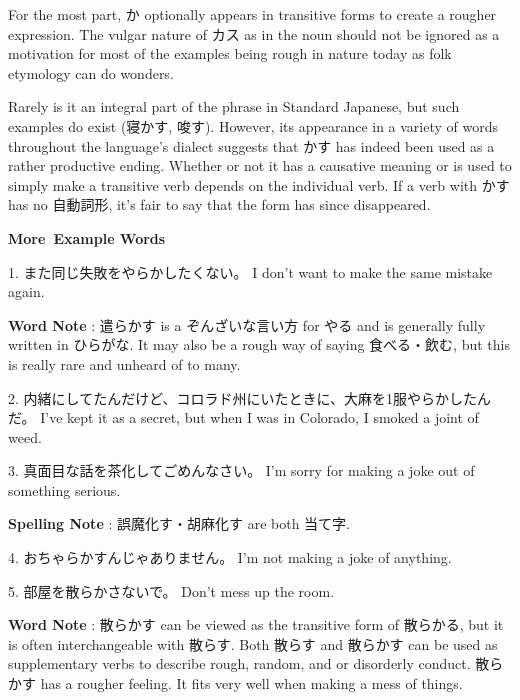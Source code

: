\par{ For the most part, か optionally appears in transitive forms to create a rougher expression. The vulgar nature of カス as in the noun should not be ignored as a motivation for most of the examples being rough in nature today as folk etymology can do wonders. }

\par{ Rarely is it an integral part of the phrase in Standard Japanese, but such examples do exist (寝かす, 唆す). However, its appearance in a variety of words throughout the language's dialect suggests that かす has indeed been used as a rather productive ending. Whether or not it has a causative meaning or is used to simply make a transitive verb depends on the individual verb. If a verb with かす has no 自動詞形, it's fair to say that the form has since disappeared. }

\begin{center}
 \textbf{More Example Words }
\end{center}

\par{1. また同じ失敗をやらかしたくない。 \hfill\break
I don't want to make the same mistake again. }

\par{\textbf{Word Note }: 遣らかす is a ぞんざいな言い方 for やる and is generally fully written in ひらがな. It may also be a rough way of saying 食べる・飲む, but this is really rare and unheard of to many. }

\par{2. 内緒にしてたんだけど、コロラド州にいたときに、大麻を1服やらかしたんだ。 \hfill\break
I've kept it as a secret, but when I was in Colorado, I smoked a joint of weed. }

\par{3. 真面目な話を茶化してごめんなさい。 \hfill\break
I'm sorry for making a joke out of something serious. }

\par{\textbf{Spelling Note }: 誤魔化す・胡麻化す are both 当て字. }

\par{4. おちゃらかすんじゃありません。 \hfill\break
I'm not making a joke of anything. }

\par{5. 部屋を散らかさないで。 \hfill\break
Don't mess up the room. }

\par{\textbf{Word Note }: 散らかす can be viewed as the transitive form of 散らかる, but it is often interchangeable with 散らす. Both 散らす and 散らかす can be used as supplementary verbs to describe rough, random, and or disorderly conduct. 散らかす has a rougher feeling. It fits very well when making a mess of things. }

